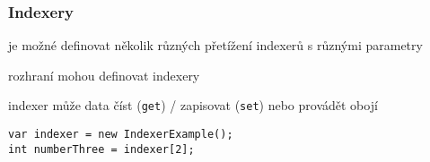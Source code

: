 \begin{frame}[fragile]
\frametitle{Indexery}
\vfill
\begin{bitemize}{}
\item je možné definovat několik různých přetížení indexerů s různými parametry
\item rozhraní mohou definovat indexery
\item indexer může data číst (\lstinline|get|) / zapisovat (\lstinline|set|) nebo provádět obojí
\end{bitemize}
\vfill
\begin{yesblock}
\begin{lstlisting}
var indexer = new IndexerExample();
int numberThree = indexer[2];
\end{lstlisting}
\end{yesblock}
\vfill
\end{frame}